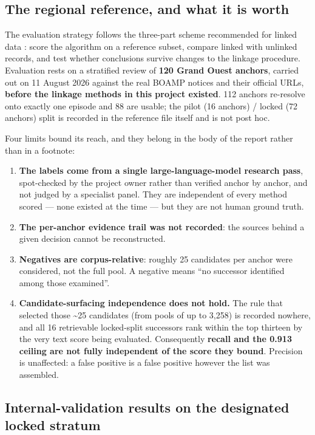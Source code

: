 \subsection{The regional reference, and what it is worth}

The evaluation strategy follows the three-part scheme recommended for linked data \citep{harron2017}: score the algorithm on a reference subset, compare linked with unlinked records, and test whether conclusions survive changes to the linkage procedure. Evaluation rests on a stratified review of \textbf{120 Grand Ouest anchors}, carried out on 11 August 2026 against the real BOAMP notices and their official URLs, \textbf{before the linkage methods in this project existed}. 112 anchors re-resolve onto exactly one episode and 88 are usable; the pilot (16 anchors) / locked (72 anchors) split is recorded in the reference file itself and is not post hoc.

Four limits bound its reach, and they belong in the body of the report rather than in a footnote:

\begin{enumerate}
\def\labelenumi{\arabic{enumi}.}
\tightlist
\item
  \textbf{The labels come from a single large-language-model research pass}, spot-checked by the project owner rather than verified anchor by anchor, and not judged by a specialist panel. They are independent of every method scored --- none existed at the time --- but they are not human ground truth.
\item
  \textbf{The per-anchor evidence trail was not recorded}: the sources behind a given decision cannot be reconstructed.
\item
  \textbf{Negatives are corpus-relative}: roughly 25 candidates per anchor were considered, not the full pool. A negative means ``no successor identified among those examined''.
\item
  \textbf{Candidate-surfacing independence does not hold.} The rule that selected those \textasciitilde25 candidates (from pools of up to 3,258) is recorded nowhere, and all 16 retrievable locked-split successors rank within the top thirteen by the very text score being evaluated. Consequently \textbf{recall and the 0.913 ceiling are not fully independent of the score they bound}. Precision is unaffected: a false positive is a false positive however the list was assembled.
\end{enumerate}

\subsection{Internal-validation results on the designated locked stratum}

